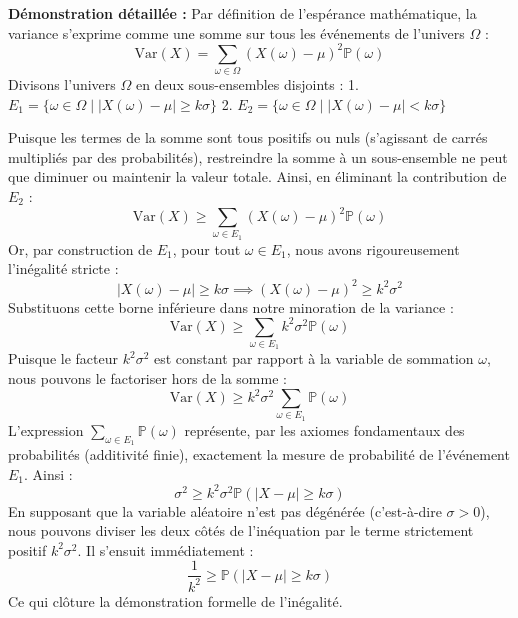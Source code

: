 \documentclass[12pt,a4paper]{article}
\begin{document}
\textbf{Démonstration détaillée :}
Par définition de l'espérance mathématique, la variance s'exprime comme une somme sur tous les événements de l'univers $\Omega$ :
$$ \text{Var}(X) = \sum_{\omega \in \Omega} (X(\omega) - \mu)^2 \mathbb{P}(\omega) $$
Divisons l'univers $\Omega$ en deux sous-ensembles disjoints :
1. $E_1 = \{\omega \in \Omega \mid |X(\omega) - \mu| \ge k\sigma\}$
2. $E_2 = \{\omega \in \Omega \mid |X(\omega) - \mu| < k\sigma\}$

Puisque les termes de la somme sont tous positifs ou nuls (s'agissant de carrés multipliés par des probabilités), restreindre la somme à un sous-ensemble ne peut que diminuer ou maintenir la valeur totale. Ainsi, en éliminant la contribution de $E_2$ :
$$ \text{Var}(X) \ge \sum_{\omega \in E_1} (X(\omega) - \mu)^2 \mathbb{P}(\omega) $$
Or, par construction de $E_1$, pour tout $\omega \in E_1$, nous avons rigoureusement l'inégalité stricte :
$$ |X(\omega) - \mu| \ge k\sigma \implies (X(\omega) - \mu)^2 \ge k^2\sigma^2 $$
Substituons cette borne inférieure dans notre minoration de la variance :
$$ \text{Var}(X) \ge \sum_{\omega \in E_1} k^2\sigma^2 \mathbb{P}(\omega) $$
Puisque le facteur $k^2\sigma^2$ est constant par rapport à la variable de sommation $\omega$, nous pouvons le factoriser hors de la somme :
$$ \text{Var}(X) \ge k^2\sigma^2 \sum_{\omega \in E_1} \mathbb{P}(\omega) $$
L'expression $\sum_{\omega \in E_1} \mathbb{P}(\omega)$ représente, par les axiomes fondamentaux des probabilités (additivité finie), exactement la mesure de probabilité de l'événement $E_1$.
Ainsi :
$$ \sigma^2 \ge k^2\sigma^2 \mathbb{P}(|X - \mu| \ge k\sigma) $$
En supposant que la variable aléatoire n'est pas dégénérée (c'est-à-dire $\sigma > 0$), nous pouvons diviser les deux côtés de l'inéquation par le terme strictement positif $k^2\sigma^2$. Il s'ensuit immédiatement :
$$ \frac{1}{k^2} \ge \mathbb{P}(|X - \mu| \ge k\sigma) $$
Ce qui clôture la démonstration formelle de l'inégalité.
\end{document}
